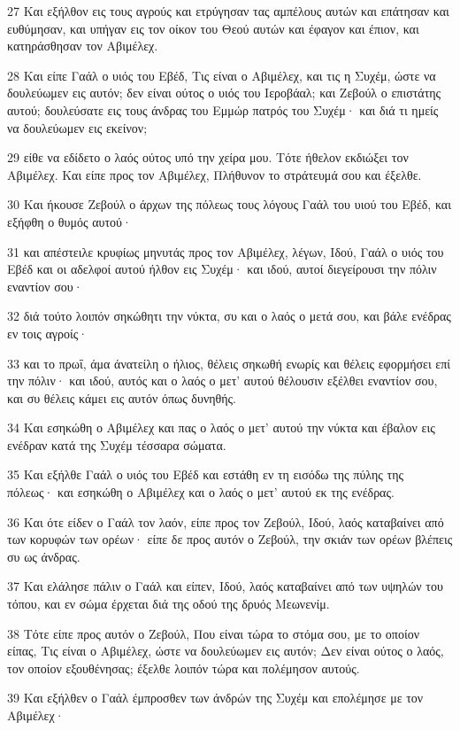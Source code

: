 \par 27 Και εξήλθον εις τους αγρούς και ετρύγησαν τας αμπέλους αυτών και επάτησαν και ευθύμησαν, και υπήγαν εις τον οίκον του Θεού αυτών και έφαγον και έπιον, και κατηράσθησαν τον Αβιμέλεχ.
\par 28 Και είπε Γαάλ ο υιός του Εβέδ, Τις είναι ο Αβιμέλεχ, και τις η Συχέμ, ώστε να δουλεύωμεν εις αυτόν; δεν είναι ούτος ο υιός του Ιεροβάαλ; και Ζεβούλ ο επιστάτης αυτού; δουλεύσατε εις τους άνδρας του Εμμώρ πατρός του Συχέμ· και διά τι ημείς να δουλεύωμεν εις εκείνον;
\par 29 είθε να εδίδετο ο λαός ούτος υπό την χείρα μου. Τότε ήθελον εκδιώξει τον Αβιμέλεχ. Και είπε προς τον Αβιμέλεχ, Πλήθυνον το στράτευμά σου και έξελθε.
\par 30 Και ήκουσε Ζεβούλ ο άρχων της πόλεως τους λόγους Γαάλ του υιού του Εβέδ, και εξήφθη ο θυμός αυτού·
\par 31 και απέστειλε κρυφίως μηνυτάς προς τον Αβιμέλεχ, λέγων, Ιδού, Γαάλ ο υιός του Εβέδ και οι αδελφοί αυτού ήλθον εις Συχέμ· και ιδού, αυτοί διεγείρουσι την πόλιν εναντίον σου·
\par 32 διά τούτο λοιπόν σηκώθητι την νύκτα, συ και ο λαός ο μετά σου, και βάλε ενέδρας εν τοις αγροίς·
\par 33 και το πρωΐ, άμα άνατείλη ο ήλιος, θέλεις σηκωθή ενωρίς και θέλεις εφορμήσει επί την πόλιν· και ιδού, αυτός και ο λαός ο μετ' αυτού θέλουσιν εξέλθει εναντίον σου, και συ θέλεις κάμει εις αυτόν όπως δυνηθής.
\par 34 Και εσηκώθη ο Αβιμέλεχ και πας ο λαός ο μετ' αυτού την νύκτα και έβαλον εις ενέδραν κατά της Συχέμ τέσσαρα σώματα.
\par 35 Και εξήλθε Γαάλ ο υιός του Εβέδ και εστάθη εν τη εισόδω της πύλης της πόλεως· και εσηκώθη ο Αβιμέλεχ και ο λαός ο μετ' αυτού εκ της ενέδρας.
\par 36 Και ότε είδεν ο Γαάλ τον λαόν, είπε προς τον Ζεβούλ, Ιδού, λαός καταβαίνει από των κορυφών των ορέων· είπε δε προς αυτόν ο Ζεβούλ, την σκιάν των ορέων βλέπεις συ ως άνδρας.
\par 37 Και ελάλησε πάλιν ο Γαάλ και είπεν, Ιδού, λαός καταβαίνει από των υψηλών του τόπου, και εν σώμα έρχεται διά της οδού της δρυός Μεωνενίμ.
\par 38 Τότε είπε προς αυτόν ο Ζεβούλ, Που είναι τώρα το στόμα σου, με το οποίον είπας, Τις είναι ο Αβιμέλεχ, ώστε να δουλεύωμεν εις αυτόν; Δεν είναι ούτος ο λαός, τον οποίον εξουθένησας; έξελθε λοιπόν τώρα και πολέμησον αυτούς.
\par 39 Και εξήλθεν ο Γαάλ έμπροσθεν των άνδρών της Συχέμ και επολέμησε με τον Αβιμέλεχ·
